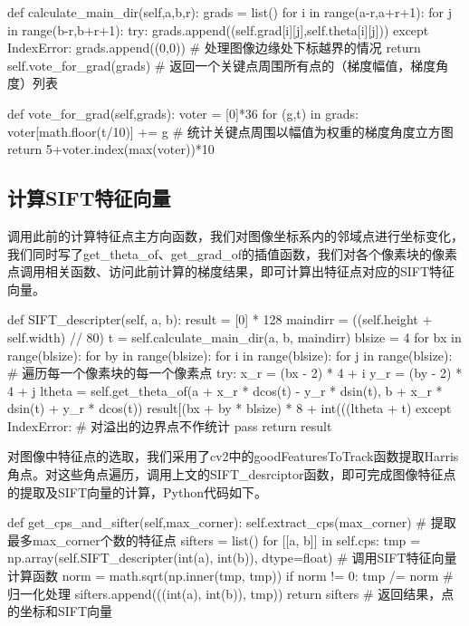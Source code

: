 \documentclass{article}
\begin{document}
\begin{python}
def calculate_main_dir(self,a,b,r):
    grads = list()
    for i in range(a-r,a+r+1):
        for j in range(b-r,b+r+1):
            try:
                grads.append((self.grad[i][j],self.theta[i][j]))
            except IndexError:
                grads.append((0,0))   # 处理图像边缘处下标越界的情况
    return self.vote_for_grad(grads)  # 返回一个关键点周围所有点的（梯度幅值，梯度角度）列表

def vote_for_grad(self,grads):
    voter = [0]*36
    for (g,t) in grads:
        voter[math.floor(t/10)] += g  # 统计关键点周围以幅值为权重的梯度角度立方图
    return 5+voter.index(max(voter))*10
\end{python}

\subsection{计算SIFT特征向量}

调用此前的计算特征点主方向函数，我们对图像坐标系内的邻域点进行坐标变化，我们同时写了get\_theta\_of、get\_grad\_of的插值函数，我们对各个像素块的像素点调用相关函数、访问此前计算的梯度结果，即可计算出特征点对应的SIFT特征向量。

\begin{python}
def SIFT_descripter(self, a, b):
    result = [0] * 128
    maindirr = ((self.height + self.width) // 80)
    t = self.calculate_main_dir(a, b, maindirr)
    blsize = 4
    for bx in range(blsize):
        for by in range(blsize):
            for i in range(blsize):
                for j in range(blsize):       # 遍历每一个像素块的每一个像素点
                    try:
                        x_r = (bx - 2) * 4 + i
                        y_r = (by - 2) * 4 + j
                        ltheta = self.get_theta_of(a + x_r * dcos(t) - y_r * dsin(t),
                                              b + x_r * dsin(t) + y_r * dcos(t))
                        result[(bx + by * blsize) * 8 + int(((ltheta + t) %
                    except IndexError:         # 对溢出的边界点不作统计
                        pass
    return result
\end{python}

对图像中特征点的选取，我们采用了cv2中的goodFeaturesToTrack函数提取Harris角点。对这些角点遍历，调用上文的SIFT\_desrciptor函数，即可完成图像特征点的提取及SIFT向量的计算，Python代码如下。

\begin{python}
def get_cps_and_sifter(self,max_corner):
    self.extract_cps(max_corner)        # 提取最多max_corner个数的特征点
    sifters = list()
    for [[a, b]] in self.cps:
        tmp = np.array(self.SIFT_descripter(int(a), int(b)), dtype=float) # 调用SIFT特征向量计算函数
        norm = math.sqrt(np.inner(tmp, tmp))
        if norm != 0:
            tmp /= norm                 # 归一化处理
            sifters.append(((int(a), int(b)), tmp))
    return sifters                      # 返回结果，点的坐标和SIFT向量
\end{python}
\end{document}
